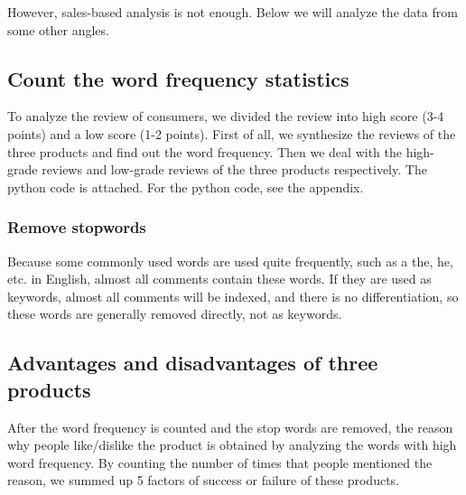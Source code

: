 \documentclass{mcmthesis}
\begin{document}
	However, sales-based analysis is not enough. Below we will analyze the data from some other angles.
	
	\subsection{Count the word frequency statistics}
	To analyze the review of consumers, we divided the review into high score (3-4 points) and a low score (1-2 points). First of all, we synthesize the reviews of the three products and find out the word frequency. Then we deal with the high-grade reviews and low-grade reviews of the three products respectively. The python code is attached. For the python code, see the appendix.
	\subsubsection{Remove stopwords}
	Because some commonly used words are used quite frequently, such as a the, he, etc. in English, almost all comments contain these words. If they are used as keywords, almost all comments will be indexed, and there is no differentiation, so these words are generally removed directly, not as keywords.
	
	
	\subsection{Advantages and disadvantages of three products}
	After the word frequency is counted and the stop words are removed, the reason why people like/dislike the product is obtained by analyzing the words with high word frequency.
	By counting the number of times that people mentioned the reason, we summed up 5 factors of success or failure of these products.
\end{document}
